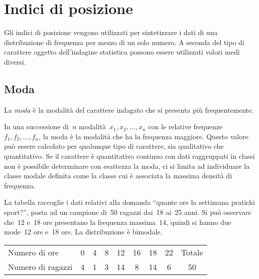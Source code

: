 

\section{Indici di posizione}
\label{sec:stat02_posizione}

Gli indici di posizione vengono utilizzati per sintetizzare i dati di una 
distribuzione di frequenza per mezzo di un solo numero.
A seconda del tipo di carattere oggetto dell'indagine statistica possono 
essere utilizzati valori medi diversi.

\subsection{Moda}
\label{subsec:stat02_moda}

\begin{definizione}
La \emph{moda} è la modalità del carattere indagato che si presenta più 
frequentemente.
\end{definizione}

In una successione di~\(n\) modalità~\(x_1, x_2, \ldots, x_n\)
con le relative frequenze~\(f_1, f_2, \ldots, f_n\), la moda è la modalità 
che ha la frequenza maggiore.
Questo valore può essere calcolato per qualunque tipo di carattere, sia 
qualitativo che quantitativo.
Se il carattere è quantitativo continuo con dati raggruppati in classi non 
è possibile determinare con esattezza la moda, ci si limita
ad individuare la classe modale definita come la classe cui è associata la 
massima densità di frequenza.


\begin{esempio}
La tabella raccoglie i dati relativi alla domanda ``quante ore la settimana 
pratichi sport?'', posta ad un
campione di~50 ragazzi dai~18 ai~25 anni. Si può osservare che~12 e~18 ore 
presentano la frequenza massima~14, quindi si hanno due
mode~12 ore e~18 ore. La distribuzione è bimodale.

\begin{center}
\begin{tabular}{lcccccccc}
\toprule
Numero di ore & 0 &4 &8 &12 &16 &18 &22 &Totale\\
 Numero di ragazzi& 4 & 1 & 3 & 14 & 8 & 14 & 6 & 50 \\
\bottomrule
\end{tabular}
\end{center}
 \end{esempio}

